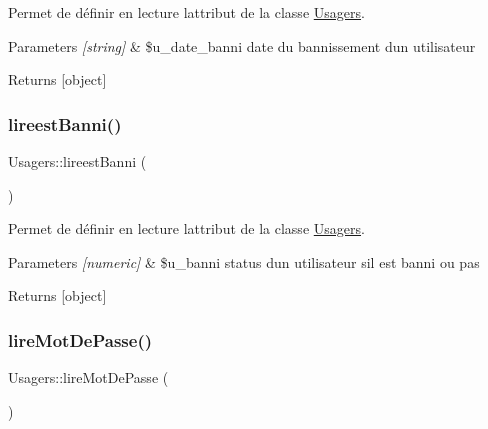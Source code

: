 Permet de définir en lecture l\textquotesingle{}attribut de la classe \hyperlink{class_usagers}{Usagers}. 


\begin{DoxyParams}{Parameters}
{\em \mbox{[}string\mbox{]}} & \$u\+\_\+date\+\_\+banni date du bannissement d\textquotesingle{}un utilisateur \\
\hline
\end{DoxyParams}
\begin{DoxyReturn}{Returns}
\mbox{[}object\mbox{]} 
\end{DoxyReturn}
\mbox{\label{class_usagers_a74e8715928e1e46651eb7fe64754c29e}} 
\subsubsection{\texorpdfstring{lireest\+Banni()}{lireestBanni()}}
{\footnotesize\ttfamily Usagers\+::lireest\+Banni (\begin{DoxyParamCaption}{ }\end{DoxyParamCaption})}



Permet de définir en lecture l\textquotesingle{}attribut de la classe \hyperlink{class_usagers}{Usagers}. 


\begin{DoxyParams}{Parameters}
{\em \mbox{[}numeric\mbox{]}} & \$u\+\_\+banni status d\textquotesingle{}un utilisateur s\textquotesingle{}il est banni ou pas \\
\hline
\end{DoxyParams}
\begin{DoxyReturn}{Returns}
\mbox{[}object\mbox{]} 
\end{DoxyReturn}
\mbox{\label{class_usagers_a01e18fe392c47c4acadb0afd23469b73}} 
\subsubsection{\texorpdfstring{lire\+Mot\+De\+Passe()}{lireMotDePasse()}}
{\footnotesize\ttfamily Usagers\+::lire\+Mot\+De\+Passe (\begin{DoxyParamCaption}{ }\end{DoxyParamCaption})}



